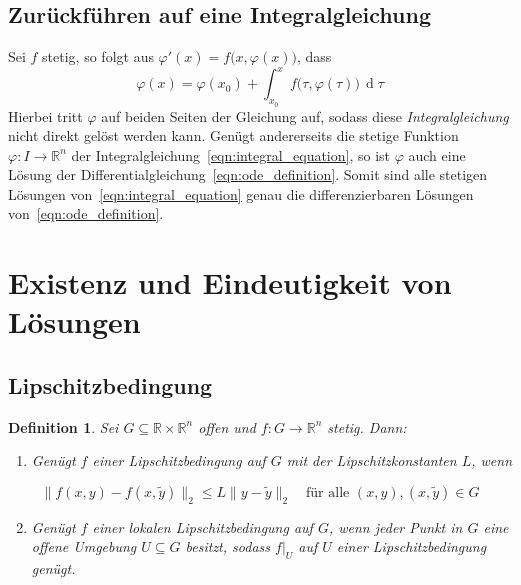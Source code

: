 \documentclass[a4paper, 11pt, accentcolor = tud3b]{tudreport}
\newtheorem{definition}[theorem]{Definition}
\DeclareMathOperator{\total}{d}
\newcommand{\dif}[1]{\,\total#1}
\newcommand{\R}{\mathbb{R}}
\begin{document}
			\subsection{Zurückführen auf eine Integralgleichung}
				Sei \( f \) stetig, so folgt aus \( \varphi'(x) = f\big(x, \varphi(x)\big) \), dass
				\begin{equation}
					\varphi(x) = \varphi(x_0) + \int_{x_0}^{x} \! f\big(\tau, \varphi(\tau)\big) \dif{\tau}  \label{eqn:integral_equation}
				\end{equation}
				Hierbei tritt \(\varphi\) auf beiden Seiten der Gleichung auf, sodass diese \emph{Integralgleichung} nicht direkt gelöst werden kann. Genügt andererseits die stetige Funktion \( \varphi : I \to \R^n \) der Integralgleichung~\ref{eqn:integral_equation}, so ist \( \varphi \) auch eine Lösung der Differentialgleichung~\ref{eqn:ode_definition}. Somit sind alle stetigen Lösungen von~\ref{eqn:integral_equation} genau die differenzierbaren Lösungen von~\ref{eqn:ode_definition}.

		\section{Existenz und Eindeutigkeit von Lösungen}
			\subsection{Lipschitzbedingung}
				\begin{definition}
					Sei \( G \subseteq \R \times \R^n \) offen und \( f : G \to \R^n \) stetig. Dann:
					\begin{enumerate}
						\item Genügt \(f\) einer Lipschitzbedingung auf \(G\) mit der Lipschitzkonstanten \(L\), wenn
					\end{enumerate}
					\begin{equation*}
						\lVert f(x, y) - f(x, \tilde{y}) \rVert_2 \leq L \lVert y - \tilde{y} \rVert_2 \quad\text{für alle } (x, y), (x, \tilde{y}) \in G
					\end{equation*}
					\begin{enumerate}
						\setcounter{enumi}{1}
						\item Genügt \(f\) einer lokalen Lipschitzbedingung auf \(G\), wenn jeder Punkt in \(G\) eine offene Umgebung \( U \subseteq G \) besitzt, sodass \( f\vert_U \) auf \(U\) einer Lipschitzbedingung genügt.
					\end{enumerate}
				\end{definition}
			
\end{document}
